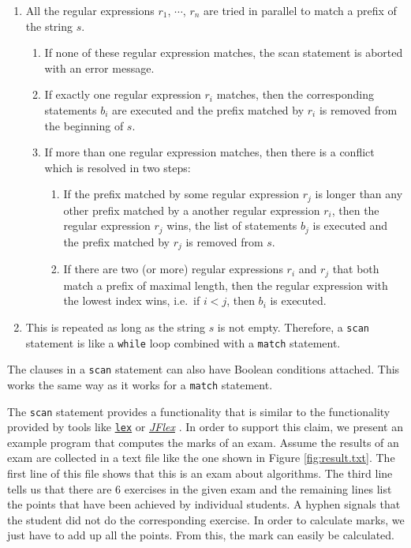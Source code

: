 \begin{enumerate}
\item All the regular expressions $r_1$, $\cdots$, $r_n$ are tried in parallel to match a
      prefix of the string $s$.
      \begin{enumerate}
      \item If none of these regular expression matches, the scan statement is aborted
            with an error message.
      \item If exactly one regular expression $r_i$ matches, then the corresponding
            statements $b_i$ are executed and the prefix matched by $r_i$ is removed from
            the beginning of $s$.
      \item If more than one regular expression matches, then there is a conflict which
            is resolved in two steps:
            \begin{enumerate}
            \item If the prefix matched by some regular expression $r_j$ is longer
                  than any other prefix matched by a another regular expression $r_i$,
                  then the regular expression $r_j$ wins, the list of statements $b_j$ is
                  executed and the prefix matched by $r_j$ is removed from $s$.
            \item If there are two (or more) regular expressions $r_i$ and $r_j$ that both
                  match a prefix of maximal length, then the regular expression with the
                  lowest index wins, i.e.~if $i < j$, then $b_i$ is executed.
            \end{enumerate}
      \end{enumerate}
\item This is repeated as long as the string $s$ is not empty.  Therefore, a \texttt{scan}
      statement is like a \texttt{while} loop combined with a \texttt{match} statement.
\end{enumerate}
The clauses in a \texttt{scan} statement can also have Boolean conditions attached.  This
works the same way as it works for a \texttt{match} statement.

The \texttt{scan} statement provides a functionality that is similar to the functionality
provided  by tools like 
\href{http://en.wikipedia.org/wiki/Lex_(software)}{\texttt{lex}} \cite{lesk:1975} or
\href{http://jflex.de}{\textsl{JFlex}} \cite{klein:2009}. 
In order to support this claim, we present an example program that computes the marks of
an exam.  Assume the results of an exam are collected in a text file like the one shown in
Figure \ref{fig:result.txt}.  The first line of this file shows that this is an exam about
algorithms.  The third line tells us
that there are 6 exercises in the given exam and the remaining lines list the points that
have been achieved by individual students.  A hyphen signals that the student did not do
the corresponding exercise.  In order to calculate marks, we just have to add up all the points.  From
this, the mark can easily be calculated.

